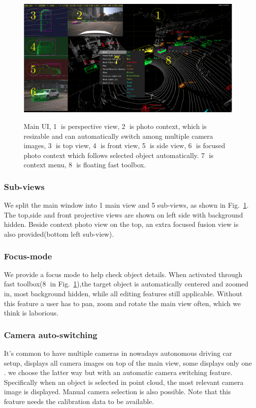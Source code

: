 \documentclass[letterpaper, 10 pt, conference]{ieeeconf}  %
\begin{document}
\begin{figure}[!t]
	\centering	
	\includegraphics[width=\linewidth]{./figures/main-ui}\\
	\caption{Main UI, \textcircled{1} is perspective view, \textcircled{2} is photo context, which is resizable and can automatically switch among multiple camera images, \textcircled{3} is top view, \textcircled{4} is front view, \textcircled{5} is side view, \textcircled{6} is focused photo context which follows selected object automatically. \textcircled{7} is context menu, \textcircled{8} is floating fast toolbox.}
	\label{fig:main-ui}
\end{figure}

\subsubsection{Sub-views}
\label{section:sub-views}
We split the main window into 1 main view and 5 sub-views, as shown in Fig.~\ref{fig:main-ui}. The top,side and front projective views are shown on left side with background hidden. Beside context photo view on the top, an extra focused fusion view is also provided(bottom left sub-view).




\subsubsection{Focus-mode}
We provide a focus mode to help check object details. When activated through fast toolbox(\textcircled{8} in Fig.~\ref{fig:main-ui}),the target object is automatically centered and zoomed in, most background hidden, while all editing features still applicable. Without this feature a user has to pan,  zoom and rotate the main view often, which we think is laborious.

\subsubsection{Camera auto-switching}
It's common to have multiple cameras in nowadays autonomous driving car setup, \cite{Zimmer20193DBA} displays all camera images on top of the main view, some displays only one \cite{scale}. we choose the latter way but with an automatic camera switching feature. Specifically when an object is selected in point cloud, the most relevant camera image is displayed. Manual camera selection is also possible. Note that this feature needs the calibration data to be available.
\end{document}
